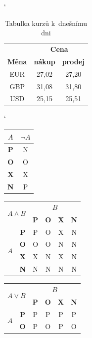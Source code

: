 \documentclass[a4paper,11pt]{article}
\begin{document}
\bigskip
\begin{table}[h]
\centering
\catcode`
\begin{tabular}{|c|c|c|} \hline
    & \multicolumn{2}{|c|}{\textbf{Cena}}\\\cline{2-3}
     \textbf{Měna} & \textbf{nákup} & \textbf{prodej} \\ \hline
     EUR & 27,02 & 27,20 \\
     GBP & 31,08 & 31,80 \\
     USD & 25,15 & 25,51\\
     \hline
\end{tabular}
\caption{Tabulka kurzů k~dnešnímu dni}
\label{tabulka:Kurzy}
\end{table}
\bigskip


\begin{table}[h]
\begin{center}
\catcode`
\begin{tabular}{|c|c|}\hline
 $A$ & $\neg A$\\\hline
 \textbf{P} & N \\\hline
 \textbf{O} & O \\\hline
 \textbf{X} & X \\\hline
 \textbf{N} & P \\\hline
\end{tabular}
\begin{tabular}{|c|c|c|c|c|c|}\hline
 \multicolumn{2}{|c|}{\multirow{2}{*}{$A \wedge B$}} & \multicolumn{4}{c|}{$B$}\\\cline{3-6}
 \multicolumn{2}{|c|}{} & \textbf{P} & \textbf{O} &\textbf{X} &\textbf{N} \\\hline
 \multirow{4}{*}{$A$} & \textbf{P} & P & O & X & N\\\cline{2-6}
                    & \textbf{O} & O & O & N & N\\\cline{2-6}
                    & \textbf{X} & X & N & X & N\\\cline{2-6}
                    & \textbf{N} & N & N & N & N\\\hline
\end{tabular}
\begin{tabular}{|c|c|c|c|c|c|}\hline
\multicolumn{2}{|c|}{\multirow{2}{*}{$A \vee B$}} & \multicolumn{4}{c|}{$B$}\\\cline{3-6}
\multicolumn{2}{|c|}{} & \textbf{P} & \textbf{O} & \textbf{X} & \textbf{N}\\\hline
\multirow{4}{*}{$A$} & \textbf{P} & P & P & P & P \\\cline{2-6}
                    & \textbf{O} & P & O & P & O \\\cline{2-6}

\end{tabular}
\end{center}
\end{table}
\end{document}
